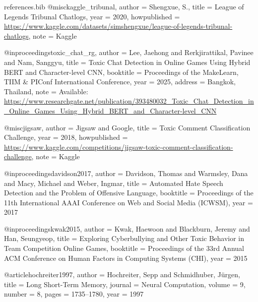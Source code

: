 \begin{filecontents*}{references.bib}
@misc{kaggle_tribunal,
  author = {Shengxue, S.},
  title = {League of Legends Tribunal Chatlogs},
  year = {2020},
  howpublished = {\url{https://www.kaggle.com/datasets/simshengxue/league-of-legends-tribunal-chatlogs}},
  note = {Kaggle}
}

@inproceedings{toxic_chat_rg,
  author = {Lee, Jaehong and Rerkjirattikal, Pavinee and Nam, Sanggyu},
  title = {Toxic Chat Detection in Online Games Using Hybrid {BERT} and Character-level {CNN}},
  booktitle = {Proceedings of the MakeLearn, TIIM \& PIConf International Conference},
  year = {2025},
  address = {Bangkok, Thailand},
  note = {Available: \url{https://www.researchgate.net/publication/393480032_Toxic_Chat_Detection_in_Online_Games_Using_Hybrid_BERT_and_Character-level_CNN}}
}

@misc{jigsaw,
  author = {Jigsaw and Google},
  title = {Toxic Comment Classification Challenge},
  year = {2018},
  howpublished = {\url{https://www.kaggle.com/competitions/jigsaw-toxic-comment-classification-challenge}},
  note = {Kaggle}
}

@inproceedings{davidson2017,
  author = {Davidson, Thomas and Warmsley, Dana and Macy, Michael and Weber, Ingmar},
  title = {Automated Hate Speech Detection and the Problem of Offensive Language},
  booktitle = {Proceedings of the 11th International AAAI Conference on Web and Social Media (ICWSM)},
  year = {2017}
}

@inproceedings{kwak2015,
  author = {Kwak, Haewoon and Blackburn, Jeremy and Han, Seungyeop},
  title = {Exploring Cyberbullying and Other Toxic Behavior in Team Competition Online Games},
  booktitle = {Proceedings of the 33rd Annual ACM Conference on Human Factors in Computing Systems (CHI)},
  year = {2015}
}

@article{hochreiter1997,
  author = {Hochreiter, Sepp and Schmidhuber, J\"{u}rgen},
  title = {Long Short-Term Memory},
  journal = {Neural Computation},
  volume = {9},
  number = {8},
  pages = {1735--1780},
  year = {1997}
}
\end{filecontents*}

\documentclass[final]{article}

\usepackage{APS360}
\usepackage[utf8]{inputenc}    %
\usepackage[T1]{fontenc}       %
\usepackage{hyperref}          %
\usepackage{url}               %
\usepackage{booktabs}          %
\usepackage{amsfonts}          %
\usepackage{nicefrac}          %
\usepackage{microtype}         %
\usepackage{xcolor}            %
\usepackage{graphicx}          %
 
